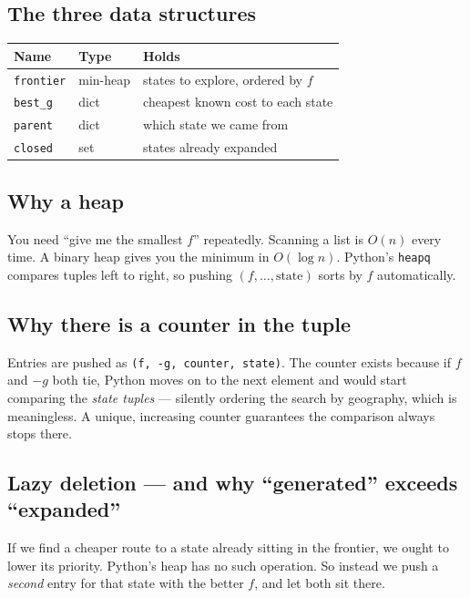 \documentclass[11pt,a4paper]{article}
\begin{document}
\subsection{The three data structures}

\begin{center}
\begin{tabular}{@{}lll@{}}
\toprule
\textbf{Name} & \textbf{Type} & \textbf{Holds} \\
\midrule
\texttt{frontier} & min-heap  & states to explore, ordered by $f$ \\
\texttt{best\_g}  & dict      & cheapest known cost to each state \\
\texttt{parent}   & dict      & which state we came from \\
\texttt{closed}   & set       & states already expanded \\
\bottomrule
\end{tabular}
\end{center}

\subsection{Why a heap}

You need ``give me the smallest $f$'' repeatedly. Scanning a list is $O(n)$ every
time. A binary heap gives you the minimum in $O(\log n)$. Python's
\texttt{heapq} compares tuples left to right, so pushing $(f, \ldots, \text{state})$
sorts by $f$ automatically.

\subsection{Why there is a counter in the tuple}

Entries are pushed as \texttt{(f, -g, counter, state)}. The counter exists because
if $f$ and $-g$ both tie, Python moves on to the next element and would start
comparing the \emph{state tuples} --- silently ordering the search by geography,
which is meaningless. A unique, increasing counter guarantees the comparison
always stops there.

\subsection{Lazy deletion --- and why ``generated'' exceeds ``expanded''}

If we find a cheaper route to a state already sitting in the frontier, we ought to
lower its priority. Python's heap has no such operation. So instead we push a
\emph{second} entry for that state with the better $f$, and let both sit there.
\end{document}
